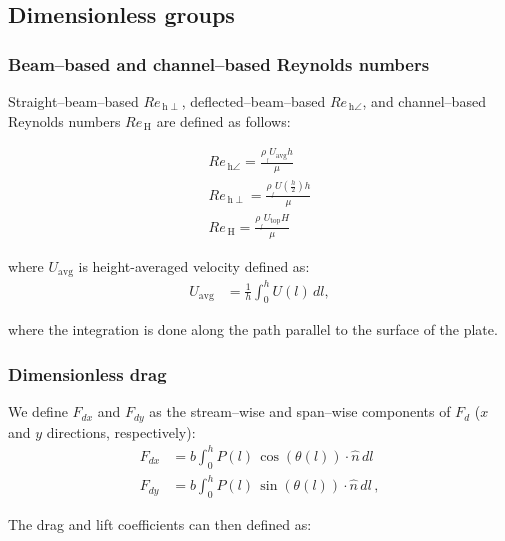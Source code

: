 \documentclass[preprint, letterpaper, nobibnotes, aps, superscriptaddress,prb]{revtex4-1}
\begin{document}
\subsection{Dimensionless groups}


\subsubsection{Beam--based and channel--based Reynolds numbers}

Straight--beam--based $Re_{\,\mathrm{h\perp}}$, deflected--beam--based $Re_{\mathrm{\,h\angle}}$, and channel--based Reynolds numbers $Re_{\,\mathrm{H}}$ are defined as follows:

\begin{gather}
Re_{\,\mathrm{h\angle}} = \frac{\rho_{_{f}} U_{\mathrm{avg}}h}{\mu} \\[1ex]
Re_{\,\mathrm{h\perp}} = \frac{\rho_{_{f}} U(\frac{h}{2})h}{\mu} \\[1ex]
Re_{\,\mathrm{H}} = \frac{\rho_{_{f}} U_{\mathrm{top}}H}{\mu} 
\end{gather}

where $U_{\mathrm{avg}}$ is height-averaged velocity defined as:
\begin{align}
U_{\mathrm{avg}} &= \frac{1}{h}\int_{0}^{h}U(l)\,dl,
\end{align}

where the integration is done along the path parallel to the surface of the plate.

\subsubsection{Dimensionless drag}

We define $F_{{dx}}$ and $F_{{dy}}$ as the stream--wise and span--wise components of $F_d$ ($x$ and $y$ directions, respectively):
\begin{align}
F_{{dx}} &= b\int_{0}^{h}P(l)\,\cos(\theta(l))\cdot\hat{n}\,dl \\
F_{{dy}} &= b\int_{0}^{h}P(l)\,\sin(\theta(l))\cdot\hat{n}\,dl\,,
\end{align}

The drag and lift coefficients can then defined as:
\end{document}

